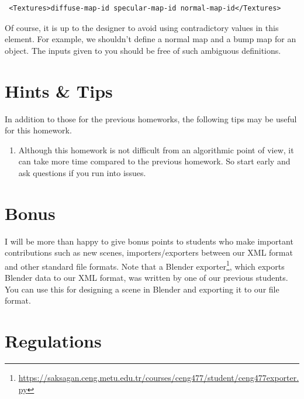 \documentclass[12pt]{article}
\begin{document}
\begin{itemize}
\begin{itemize}
\begin{verbatim}
 <Textures>diffuse-map-id specular-map-id normal-map-id</Textures>
\end{verbatim}

Of course, it is up to the designer to avoid using contradictory
values in this element. For example, we shouldn't define a normal map
and a bump map for an object. The inputs given to you should be free
of such ambiguous definitions.

\end{itemize}


\end{itemize}

\section{Hints \& Tips}
In addition to those for the previous homeworks, the following tips may
be useful for this homework.

\begin{enumerate}
\item \textbf{} Although this homework is not difficult from an
algorithmic point of view, it can take more time compared to the
previous homework. So start early and ask questions if you run into
issues.

\end{enumerate}

\section{Bonus}

I will be more than happy to give bonus points to students who
make important contributions such as new scenes, importers/exporters
between our XML format and other standard file formats. Note that a
Blender
exporter\footnote{\url{https://saksagan.ceng.metu.edu.tr/courses/ceng477/student/ceng477exporter.py}},
which exports Blender data to our XML format, was written by one of our
previous students. You can use this for designing a scene in Blender and
exporting it to our file format.

\section{Regulations}
\end{document}
